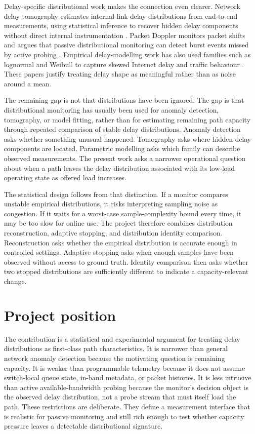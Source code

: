 Delay-specific distributional work makes the connection even clearer. Network delay tomography estimates internal link delay distributions from end-to-end measurements, using statistical inference to recover hidden delay components without direct internal instrumentation \cite{tsangDelayTomography}. Packet Doppler monitors packet shifts and argues that passive distributional monitoring can detect burst events missed by active probing \cite{qiuPacketDoppler}. Empirical delay-modelling work has also used families such as lognormal and Weibull to capture skewed Internet delay and traffic behaviour \cite{karakasDelay,downeyLognormal,arfeenWeibull}. These papers justify treating delay shape as meaningful rather than as noise around a mean.

The remaining gap is not that distributions have been ignored. The gap is that distributional monitoring has usually been used for anomaly detection, tomography, or model fitting, rather than for estimating remaining path capacity through repeated comparison of stable delay distributions. Anomaly detection asks whether something unusual happened. Tomography asks where hidden delay components are located. Parametric modelling asks which family can describe observed measurements. The present work asks a narrower operational question about when a path leaves the delay distribution associated with its low-load operating state as offered load increases.

The statistical design follows from that distinction. If a monitor compares unstable empirical distributions, it risks interpreting sampling noise as congestion. If it waits for a worst-case sample-complexity bound every time, it may be too slow for online use. The project therefore combines distribution reconstruction, adaptive stopping, and distribution identity comparison. Reconstruction asks whether the empirical distribution is accurate enough in controlled settings. Adaptive stopping asks when enough samples have been observed without access to ground truth. Identity comparison then asks whether two stopped distributions are sufficiently different to indicate a capacity-relevant change.

\section{Project position}

The contribution is a statistical and experimental argument for treating delay distributions as first-class path characteristics. It is narrower than general network anomaly detection because the motivating question is remaining capacity. It is weaker than programmable telemetry because it does not assume switch-local queue state, in-band metadata, or packet histories. It is less intrusive than active available-bandwidth probing because the monitor's decision object is the observed delay distribution, not a probe stream that must itself load the path. These restrictions are deliberate. They define a measurement interface that is realistic for passive monitoring and still rich enough to test whether capacity pressure leaves a detectable distributional signature.

